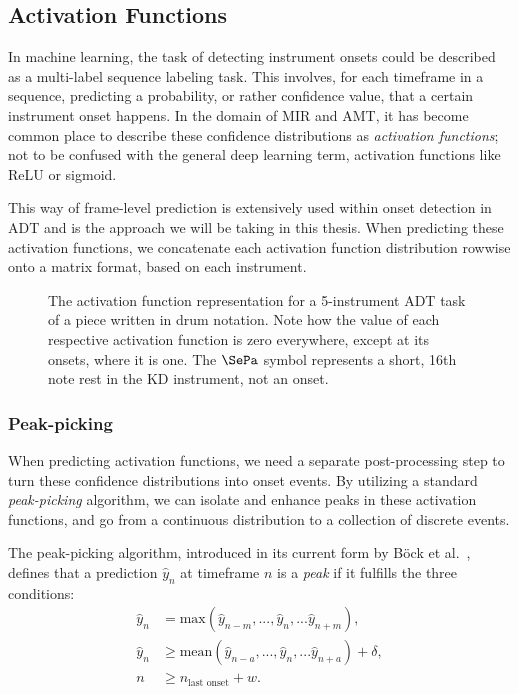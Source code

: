 \subsection{Activation Functions}

In machine learning, the task of detecting instrument onsets could be described as a multi-label sequence labeling task. This involves, for each timeframe in a sequence, predicting a probability, or rather confidence value, that a certain instrument onset happens. In the domain of \gls{MIR} and \gls{AMT}, it has become common place to describe these confidence distributions as \textit{activation functions}; not to be confused with the general deep learning term, activation functions like ReLU or sigmoid.~\cite{8350302, Southall2016AutomaticDT, vogl2018multiinstrumentdrumtranscription}

This way of frame-level prediction is extensively used within onset detection in \gls{ADT} and is the approach we will be taking in this thesis. When predicting these activation functions, we concatenate each activation function distribution rowwise onto a matrix format, based on each instrument.

\begin{figure}[H]
    \centering
    \hspace*{-0.5cm}
    
    \caption{The activation function representation for a 5-instrument \gls{ADT} task of a piece written in drum notation. Note how the value of each respective activation function is zero everywhere, except at its onsets, where it is one. The $\SePa$ symbol represents a short, 16th note rest in the \gls{KD} instrument, not an onset.}
    \label{ActivationsFigure}
\end{figure}

\subsubsection{Peak-picking}

When predicting activation functions, we need a separate post-processing step to turn these confidence distributions into onset events. By utilizing a standard \textit{peak-picking} algorithm, we can isolate and enhance peaks in these activation functions, and go from a continuous distribution to a collection of discrete events.

The peak-picking algorithm, introduced in its current form by Böck et al.~\cite{Bck2012EvaluatingTO}, defines that a prediction $\hat{y}_n$ at timeframe $n$ is a \textit{peak} if it fulfills the three conditions:
\begin{align*} 
    \hat{y}_n &= \text{max}(\hat{y}_{n - m}, ..., \hat{y}_n, ... \hat{y}_{n + m}), \\ 
    \hat{y}_n &\ge \text{mean}(\hat{y}_{n - a}, ..., \hat{y}_n, ... \hat{y}_{n + a}) + \delta, \\
    n &\ge n_\text{last onset} + w.
\end{align*}

